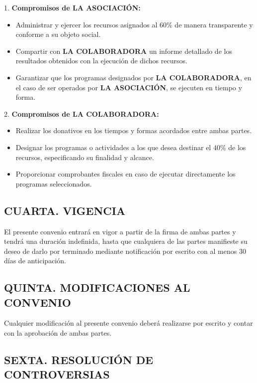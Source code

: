 \documentclass[a4paper,12pt]{article}
\begin{document}
1. \textbf{Compromisos de LA ASOCIACIÓN:}
    \begin{itemize}
        \item Administrar y ejercer los recursos asignados al 60\% de manera transparente y conforme a su objeto social.
        \item Compartir con \textbf{LA COLABORADORA} un informe detallado de los resultados obtenidos con la ejecución de dichos recursos.
        \item Garantizar que los programas designados por \textbf{LA COLABORADORA}, en el caso de ser operados por \textbf{LA ASOCIACIÓN}, se ejecuten en tiempo y forma.
    \end{itemize}

2. \textbf{Compromisos de LA COLABORADORA:}
    \begin{itemize}
        \item Realizar los donativos en los tiempos y formas acordados entre ambas partes.
        \item Designar los programas o actividades a los que desea destinar el 40\% de los recursos, especificando su finalidad y alcance.
        \item Proporcionar comprobantes fiscales en caso de ejecutar directamente los programas seleccionados.
    \end{itemize}

\subsection*{CUARTA. VIGENCIA}

El presente convenio entrará en vigor a partir de la firma de ambas partes y tendrá una duración indefinida, hasta que cualquiera de las partes manifieste su deseo de darlo por terminado mediante notificación por escrito con al menos 30 días de anticipación.

\subsection*{QUINTA. MODIFICACIONES AL CONVENIO}

Cualquier modificación al presente convenio deberá realizarse por escrito y contar con la aprobación de ambas partes.

\subsection*{SEXTA. RESOLUCIÓN DE CONTROVERSIAS}
\end{document}
